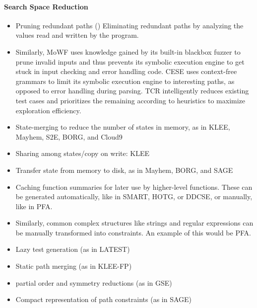 \documentclass{article}
\begin{document}
\paragraph{Search Space Reduction}
\begin{itemize}
  \item Pruning redundant paths (\cite{RWset}) Eliminating redundant paths by analyzing the values read and written by the program.
  \item Similarly, MoWF\cite{MoWF} uses knowledge gained by its built-in blackbox fuzzer to prune invalid inputs and thus prevents its symbolic execution engine to get stuck in input checking and error handling code. CESE\cite{CESE} uses context-free grammars to limit its symbolic execution engine to interesting paths, as opposed to error handling during parsing. TCR\cite{TCR} intelligently reduces existing test cases and prioritizes the remaining according to heuristics to maximize exploration efficiency.
  \item State-merging to reduce the number of states in memory, as in KLEE\cite{KLEE}, Mayhem\cite{Mayhem}, S2E\cite{S2E}, BORG\cite{BORG}, and Cloud9\cite{Cloud9}
  \item Sharing among states/copy on write: KLEE\cite{KLEE}
  \item Transfer state from memory to disk, as in Mayhem\cite{Mayhem}, BORG\cite{BORG}, and SAGE\cite{SAGE}
  \item Caching function summaries for later use by higher-level functions. These can be generated automatically, like in SMART\cite{SMART}, HOTG\cite{HigherOrderTestGeneration}, or DDCSE\cite{DDCSE}, or manually, like in PFA\cite{PFA}.
  \item Similarly, common complex structures like strings and regular expressions can be manually transformed into constraints. An example of this would be PFA\cite{PFA}.
  \item Lazy test generation (as in LATEST\cite{LATEST})
  \item Static path merging (as in KLEE-FP\cite{KLEEFP})
  \item partial order and symmetry reductions (as in GSE\cite{GSE})
  \item Compact representation of path constraints (as in SAGE\cite{SAGE})
\end{itemize}
\end{document}
